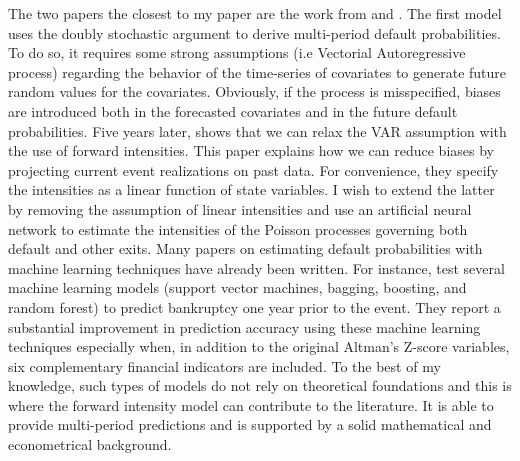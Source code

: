 The two papers the closest to my paper are the work from \citet{DSW} and \citet{Duan2012}. The first model uses the doubly stochastic argument to derive multi-period default probabilities. To do so, it requires some strong assumptions (i.e Vectorial Autoregressive process) regarding the behavior of the time-series of covariates to generate future random values for the covariates. Obviously, if the process is misspecified, biases are introduced both in the forecasted covariates and in the future default probabilities. Five years later, \citet{Duan2012} shows that we can relax the VAR assumption with the use of forward intensities. This paper explains how we can reduce biases by projecting current event realizations on past data. For convenience, they specify the intensities as a linear function of state variables. I wish to extend the latter by removing the assumption of linear intensities and use an artificial neural network to estimate the intensities of the Poisson processes governing both default and other exits. 
Many papers on estimating default probabilities with machine learning techniques have already been written. For instance, \citet{barboza2017machine} test several machine learning models (support vector machines, bagging, boosting, and random forest) to predict bankruptcy one year prior to the event. They report a substantial improvement in prediction accuracy using these machine learning techniques especially when, in addition to the original Altman’s Z-score variables, six complementary financial indicators are included. To the best of my knowledge, such types of models do not rely on theoretical foundations and this is where the forward intensity model can contribute to the literature. It is able to provide multi-period predictions and is supported by a solid mathematical and econometrical background.

